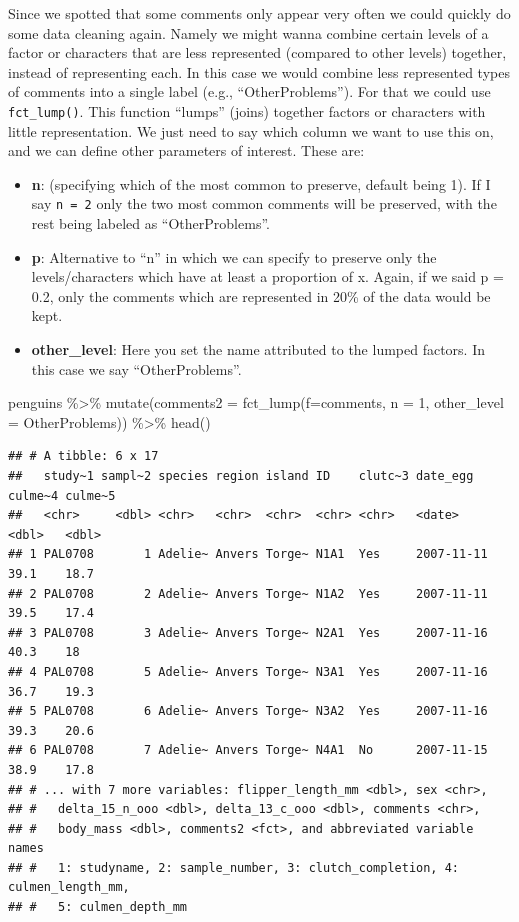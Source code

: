 \documentclass[
]{book}
\newenvironment{Shaded}{\begin{snugshade}}{\end{snugshade}}
\newcommand{\AttributeTok}[1]{\textcolor[rgb]{0.77,0.63,0.00}{#1}}
\newcommand{\DecValTok}[1]{\textcolor[rgb]{0.00,0.00,0.81}{#1}}
\newcommand{\FunctionTok}[1]{\textcolor[rgb]{0.00,0.00,0.00}{#1}}
\newcommand{\NormalTok}[1]{#1}
\newcommand{\SpecialCharTok}[1]{\textcolor[rgb]{0.00,0.00,0.00}{#1}}
\newcommand{\StringTok}[1]{\textcolor[rgb]{0.31,0.60,0.02}{#1}}
\begin{document}
Since we spotted that some comments only appear very often we could quickly do some data cleaning again.
Namely we might wanna combine certain levels of a factor or characters that are less represented (compared to other levels) together, instead of representing each.
In this case we would combine less represented types of comments into a single label (e.g., ``OtherProblems'').
For that we could use \texttt{fct\_lump()}.
This function ``lumps'' (joins) together factors or characters with little representation.
We just need to say which column we want to use this on, and we can define other parameters of interest.
These are:

\begin{itemize}
\item
  \textbf{n}: (specifying which of the most common to preserve, default being 1).
  If I say \texttt{n\ =\ 2} only the two most common comments will be preserved, with the rest being labeled as ``OtherProblems''.
\item
  \textbf{p}: Alternative to ``n'' in which we can specify to preserve only the levels/characters which have at least a proportion of x.
  Again, if we said p = 0.2, only the comments which are represented in 20\% of the data would be kept.
\item
  \textbf{other\_level}: Here you set the name attributed to the lumped factors.
  In this case we say ``OtherProblems''.
\end{itemize}

\begin{Shaded}
\begin{Highlighting}[]
\NormalTok{penguins }\SpecialCharTok{\%\textgreater{}\%} 
  \FunctionTok{mutate}\NormalTok{(}\AttributeTok{comments2 =} \FunctionTok{fct\_lump}\NormalTok{(}\AttributeTok{f=}\NormalTok{comments, }\AttributeTok{n =} \DecValTok{1}\NormalTok{, }\AttributeTok{other\_level =} \StringTok{\textquotesingle{}OtherProblems\textquotesingle{}}\NormalTok{)) }\SpecialCharTok{\%\textgreater{}\%} 
  \FunctionTok{head}\NormalTok{()}
\end{Highlighting}
\end{Shaded}

\begin{verbatim}
## # A tibble: 6 x 17
##   study~1 sampl~2 species region island ID    clutc~3 date_egg   culme~4 culme~5
##   <chr>     <dbl> <chr>   <chr>  <chr>  <chr> <chr>   <date>       <dbl>   <dbl>
## 1 PAL0708       1 Adelie~ Anvers Torge~ N1A1  Yes     2007-11-11    39.1    18.7
## 2 PAL0708       2 Adelie~ Anvers Torge~ N1A2  Yes     2007-11-11    39.5    17.4
## 3 PAL0708       3 Adelie~ Anvers Torge~ N2A1  Yes     2007-11-16    40.3    18  
## 4 PAL0708       5 Adelie~ Anvers Torge~ N3A1  Yes     2007-11-16    36.7    19.3
## 5 PAL0708       6 Adelie~ Anvers Torge~ N3A2  Yes     2007-11-16    39.3    20.6
## 6 PAL0708       7 Adelie~ Anvers Torge~ N4A1  No      2007-11-15    38.9    17.8
## # ... with 7 more variables: flipper_length_mm <dbl>, sex <chr>,
## #   delta_15_n_ooo <dbl>, delta_13_c_ooo <dbl>, comments <chr>,
## #   body_mass <dbl>, comments2 <fct>, and abbreviated variable names
## #   1: studyname, 2: sample_number, 3: clutch_completion, 4: culmen_length_mm,
## #   5: culmen_depth_mm
\end{verbatim}
\end{document}
